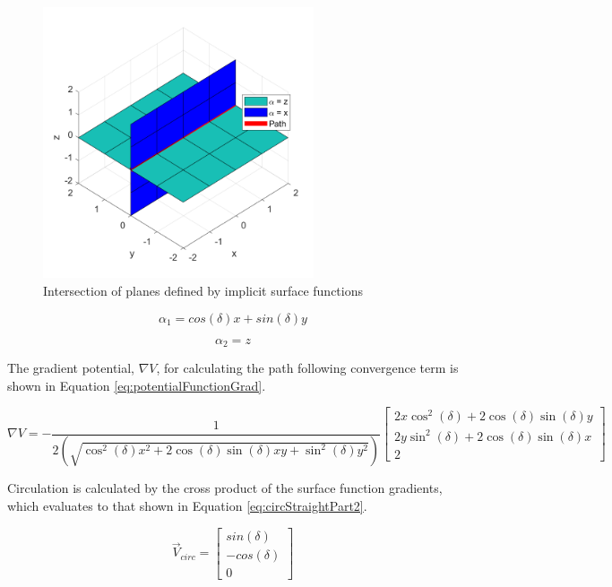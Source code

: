 \documentclass[numbered,pdftex]{ohio-etd}
\begin{document}
\begin{figure}[H]
	\centering
	\includegraphics[width=8cm]{Figures/planeIntersection}
	\caption{Intersection of planes defined by implicit surface functions}
	\label{fig:planeIntersection}
\end{figure}



\begin{equation}
\label{eq:pathFunction}
\alpha_1 = cos(\delta)x + sin(\delta)y
\end{equation}

\begin{equation}
\label{eq:pathFunctionZ}
\alpha_2 = z
\end{equation}

\noindent
The gradient potential, $\nabla V$, for calculating the path following convergence term is shown in Equation \ref{eq:potentialFunctionGrad}.

\begin{equation}
\label{eq:potentialFunctionGrad}
\nabla V = -\frac{1}{2(\sqrt{\cos^2(\delta) x^2+2\cos(\delta)\sin(\delta) xy +\sin^2 (\delta) y^2})} \begin{bmatrix}
2x\cos^2(\delta) + 2\cos(\delta)\sin(\delta) y \\
2y\sin^2(\delta) + 2\cos(\delta)\sin(\delta) x \\
2
\end{bmatrix}
\end{equation}

\noindent
Circulation is calculated by the cross product of the surface function gradients, which evaluates to that shown in Equation \ref{eq:circStraightPart2}.


\begin{equation}
\label{eq:circStraightPart2}
\overrightarrow{V}_{circ} = \begin{bmatrix}
sin(\delta) \\
-cos(\delta) \\
0
\end{bmatrix}
\end{equation}
\end{document}
